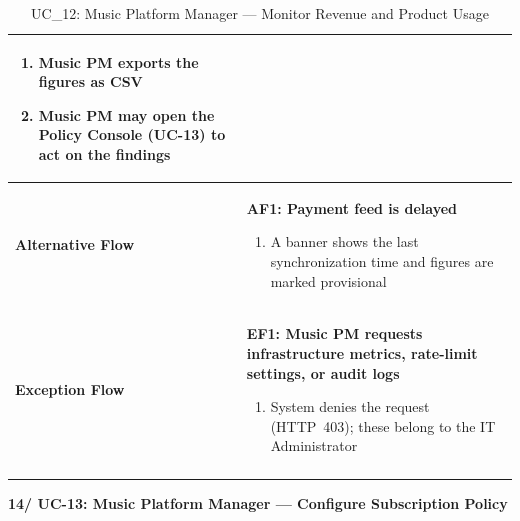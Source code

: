\documentclass[a4paper]{article}
\newlength{\ucLeft}
\begin{document}
\begin{longtable}{|>{\bfseries}p{\ucLeft}|p{\dimexpr\linewidth-\ucLeft-2\tabcolsep-2\arrayrulewidth}|}
\begin{enumerate}[leftmargin=1.5em, nosep, topsep=2pt, partopsep=0pt, parsep=0pt, after=\strut]
    \item Music PM exports the figures as CSV
    \item Music PM may open the Policy Console (UC-13) to act on the findings
\end{enumerate}
\\ \hline
Alternative Flow &
\textbf{AF1: Payment feed is delayed}
\begin{enumerate}[leftmargin=1.5em, nosep, topsep=2pt, partopsep=0pt, parsep=0pt, after=\strut]
    \item A banner shows the last synchronization time and figures are marked provisional
\end{enumerate}
\\ \hline
Exception Flow &
\textbf{EF1: Music PM requests infrastructure metrics, rate-limit settings, or audit logs}
\begin{enumerate}[leftmargin=1.5em, nosep, topsep=2pt, partopsep=0pt, parsep=0pt, after=\strut]
    \item System denies the request (HTTP~403); these belong to the IT Administrator
\end{enumerate}
\\ \hline
\caption{UC\_12: Music Platform Manager --- Monitor Revenue and Product Usage}\label{tab:uc12_revenue}
\end{longtable}

\vspace{0.5em}
\noindent\textbf{14/ UC-13: Music Platform Manager --- Configure Subscription Policy}
\end{document}
